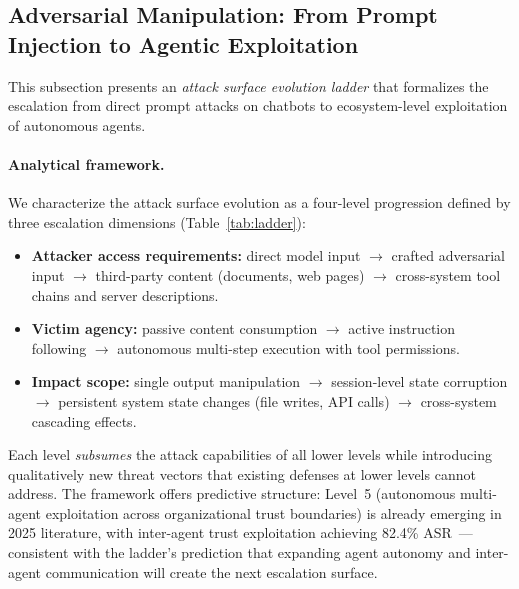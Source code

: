 \subsection{Adversarial Manipulation: From Prompt Injection to Agentic Exploitation}
\label{sec:threat-adversarial}


This subsection presents an \emph{attack surface evolution ladder} that formalizes the escalation from direct prompt attacks on chatbots to ecosystem-level exploitation of autonomous agents.

\paragraph{Analytical framework.}
We characterize the attack surface evolution as a four-level progression defined by three escalation dimensions (Table~\ref{tab:ladder}):
\begin{itemize}[nosep,leftmargin=1.5em]
    \item \textbf{Attacker access requirements:} direct model input $\to$ crafted adversarial input $\to$ third-party content (documents, web pages) $\to$ cross-system tool chains and server descriptions.
    \item \textbf{Victim agency:} passive content consumption $\to$ active instruction following $\to$ autonomous multi-step execution with tool permissions.
    \item \textbf{Impact scope:} single output manipulation $\to$ session-level state corruption $\to$ persistent system state changes (file writes, API calls) $\to$ cross-system cascading effects.
\end{itemize}
Each level \emph{subsumes} the attack capabilities of all lower levels while introducing qualitatively new threat vectors that existing defenses at lower levels cannot address. The framework offers predictive structure: Level~5 (autonomous multi-agent exploitation across organizational trust boundaries) is already emerging in 2025 literature, with inter-agent trust exploitation achieving 82.4\% ASR~\cite{darkside2025agents}---consistent with the ladder's prediction that expanding agent autonomy and inter-agent communication will create the next escalation surface.

